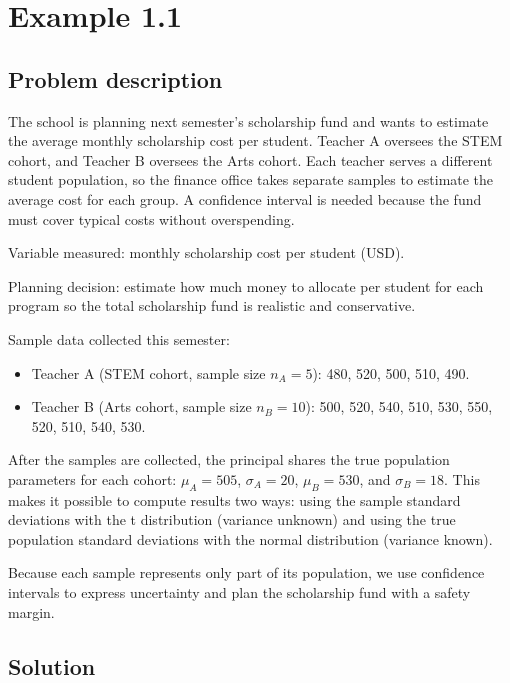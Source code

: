 \section{Example 1.1}\label{sec:interval-example1-1}

\subsection{Problem description}\label{subsec:interval-example1-1-problem}

The school is planning next semester's scholarship fund and wants to estimate the average monthly scholarship cost per student. Teacher A oversees the STEM cohort, and Teacher B oversees the Arts cohort. Each teacher serves a different student population, so the finance office takes separate samples to estimate the average cost for each group. A confidence interval is needed because the fund must cover typical costs without overspending.

Variable measured: monthly scholarship cost per student (USD).

Planning decision: estimate how much money to allocate per student for each program so the total scholarship fund is realistic and conservative.

Sample data collected this semester:

\begin{itemize}
	\item Teacher A (STEM cohort, sample size \(n_A = 5\)): 480, 520, 500, 510, 490.
	\item Teacher B (Arts cohort, sample size \(n_B = 10\)): 500, 520, 540, 510, 530, 550, 520, 510, 540, 530.
\end{itemize}

After the samples are collected, the principal shares the true population parameters for each cohort: \(\mu_A = 505\), \(\sigma_A = 20\), \(\mu_B = 530\), and \(\sigma_B = 18\). This makes it possible to compute results two ways: using the sample standard deviations with the t distribution (variance unknown) and using the true population standard deviations with the normal distribution (variance known).

Because each sample represents only part of its population, we use confidence intervals to express uncertainty and plan the scholarship fund with a safety margin.

\subsection{Solution}\label{subsec:interval-example1-1-solution}


